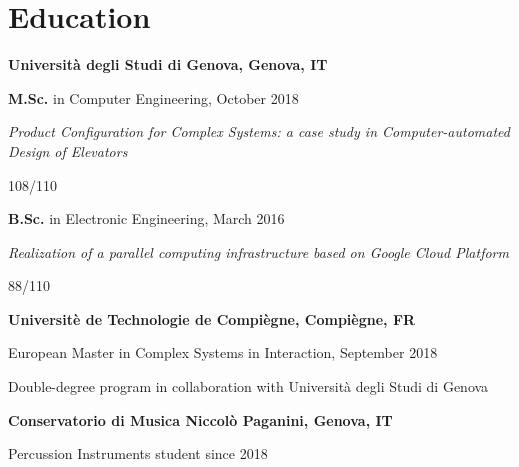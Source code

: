 \section{\sc Education}
{\bf Universit\`a degli Studi di Genova, Genova, IT}
\begin{list1}
\item[] \textbf{M.Sc.} in Computer Engineering, October 2018
\item[] \textit{Product Configuration for Complex Systems: a case study
	in Computer-automated Design of Elevators}
\item[] 108/110
\end{list1}
\begin{list1}
	\item[] \textbf{B.Sc.} in Electronic Engineering, March 2016
	\item[] \textit{Realization of a parallel computing infrastructure 
		based on Google Cloud Platform}
	\item[] 88/110
\end{list1}

{\bf Universit\`e de Technologie de Compi\`egne, Compi\`egne, FR}
\begin{list1}
	\item[] European Master in Complex Systems in Interaction, September 2018
	\item[] Double-degree program in collaboration with Universit\`a 
	degli Studi di Genova
\end{list1}

{\bf Conservatorio di Musica Niccol\`o Paganini, Genova, IT}
\begin{list1}
	\item[] Percussion Instruments student since 2018
\end{list1}